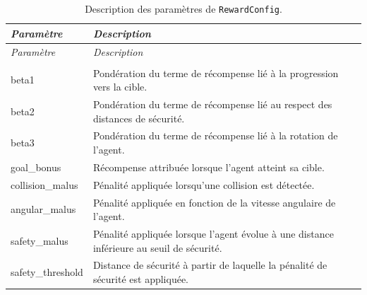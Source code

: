 \begin{longtable}{
        >{\ttfamily\small}p{}
        p{}
    }
    \caption{Description des paramètres de \texttt{RewardConfig}.}
    \label{tab:reward_parameters}                                                                                               \\

    \toprule
    \textnormal{\textit{Paramètre}} & \textit{Description}                                                                      \\
    \midrule
    \endfirsthead

    \toprule
    \textnormal{\textit{Paramètre}} & \textit{Description}                                                                      \\
    \midrule
    \endhead

    \midrule
    \\
    \endfoot

    \bottomrule
    \endlastfoot

    beta1
                                    & Pondération du terme de récompense lié à la progression vers la cible.                    \\

    beta2
                                    & Pondération du terme de récompense lié au respect des distances de sécurité.              \\

    beta3
                                    & Pondération du terme de récompense lié à la rotation de l'agent.                          \\

    goal\_bonus
                                    & Récompense attribuée lorsque l'agent atteint sa cible.                                    \\

    collision\_malus
                                    & Pénalité appliquée lorsqu'une collision est détectée.                                     \\

    angular\_malus
                                    & Pénalité appliquée en fonction de la vitesse angulaire de l'agent.                        \\

    safety\_malus
                                    & Pénalité appliquée lorsque l'agent évolue à une distance inférieure au seuil de sécurité. \\

    safety\_threshold
                                    & Distance de sécurité à partir de laquelle la pénalité de sécurité est appliquée.          \\
\end{longtable}

